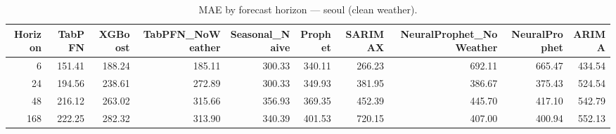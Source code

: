 \begin{table}[ht!]
\centering
\caption{MAE by forecast horizon — seoul (clean weather).}
\label{tab:mae_by_horizon_seoul}
\begin{tabular}{rrrrrrrrrr}
\toprule
Horizon & TabPFN & XGBoost & TabPFN_NoWeather & Seasonal_Naive & Prophet & SARIMAX & NeuralProphet_NoWeather & NeuralProphet & ARIMA \\
\midrule
6 & 151.41 & 188.24 & 185.11 & 300.33 & 340.11 & 266.23 & 692.11 & 665.47 & 434.54 \\
24 & 194.56 & 238.61 & 272.89 & 300.33 & 349.93 & 381.95 & 386.67 & 375.43 & 524.54 \\
48 & 216.12 & 263.02 & 315.66 & 356.93 & 369.35 & 452.39 & 445.70 & 417.10 & 542.79 \\
168 & 222.25 & 282.32 & 313.90 & 340.39 & 401.53 & 720.15 & 407.00 & 400.94 & 552.13 \\
\bottomrule
\end{tabular}
\end{table}
